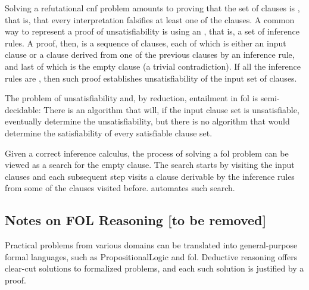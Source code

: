 Solving a refutational \gls{cnf} problem amounts to proving that the set of clauses is ,
that is, that every interpretation falsifies at least one of the clauses.
A common way to represent a proof of unsatisfiability is using an ,
that is, a set of inference rules.
A proof, then, is a sequence of clauses,
each of which is either an input clause or a clause derived from one of the previous clauses by an inference rule, and
last of which is the empty clause (a trivial contradiction).
If all the inference rules are , then such proof establishes unsatisfiability of the input set of clauses.


The problem of unsatisfiability and, by reduction, entailment in \gls{fol} is semi-decidable:
There is an algorithm that will, if the input clause set is unsatisfiable, eventually determine the unsatisfiability,
but there is no algorithm that would determine the satisfiability of every satisfiable clause set.

Given a correct inference calculus, the process of solving a \gls{fol} problem can be viewed as a search for the empty clause.
The search starts by visiting the input clauses and
each subsequent step visits a clause derivable by the inference rules from some of the clauses visited before.
 automates such search.

\subsection{Notes on FOL Reasoning [to be removed]}


Practical problems from various domains can be translated into general-purpose formal languages,
such as \gls{PropositionalLogic} and \gls{fol}.
Deductive reasoning offers clear-cut solutions to formalized problems,
and each such solution is justified by a proof.

